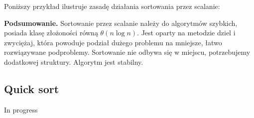 Poniższy przykład ilustruje zasadę działania sortowania przez scalanie:\\
{}

\textbf{Podsumowanie.} Sortowanie przez scalanie należy do algorytmów szybkich, posiada klasę złożoności równą $\theta(n\log n)$. Jest oparty na metodzie dziel i zwyciężaj, która powoduje podział dużego problemu na mniejsze, łatwo rozwiązywane podproblemy. Sortowanie nie odbywa się w miejscu, potrzebujemy dodatkowej struktury. Algorytm jest stabilny.

\subsection{Quick sort}

In progress
